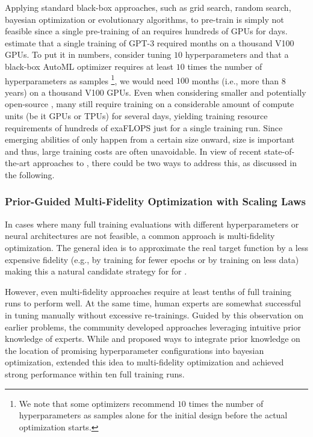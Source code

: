 Applying standard black-box \AutoML approaches, such as grid search, random search, bayesian optimization or evolutionary algorithms, to pre-train \LLMs is simply not feasible since a single pre-training of an \LLM requires hundreds of GPUs for days. \cite{brown-neurips20a} estimate that a single training of GPT-3 required months on a thousand V100 GPUs. To put it in numbers, consider tuning $10$ hyperparameters and that a black-box AutoML optimizer requires at least $10$ times the number of hyperparameters as samples \footnote{We note that some optimizers recommend $10$ times the number of hyperparameters as samples alone for the initial design before the actual optimization starts.}, we would need $100$ months (i.e., more than 8 years) on a thousand V100 GPUs. Even when considering smaller and potentially open-source \LLMs, many still require training on a considerable amount of compute units (be it GPUs or TPUs) for several days, yielding training resource requirements of hundreds of exaFLOPS \cite{geiping-icml23a} just for a single training run. Since emerging abilities of \LLMs only happen from a certain size onward, size is important and thus, large training costs are often unavoidable. In view of recent state-of-the-art approaches to \AutoML, there could be two ways to address this, as discussed in the following.

\subsubsection{Prior-Guided Multi-Fidelity Optimization with Scaling Laws}

In cases where many full training evaluations with different hyperparameters or neural architectures are not feasible, a common \AutoML approach is multi-fidelity optimization. The general idea is to approximate the real target function by a less expensive fidelity (e.g., by training for fewer epochs or by training on less data) making this a natural candidate strategy for \HPO for \LLMs.

However, even multi-fidelity approaches require at least tenths of full training runs to perform well. At the same time, human experts are somewhat successful in tuning \LLMs manually without excessive re-trainings. Guided by this observation on earlier \AutoML problems, the community developed approaches leveraging intuitive prior knowledge of experts. While \cite{souza-ecmlpkdd21a} and \cite{hvarfner-iclr22a} proposed ways to integrate prior knowledge on the location of promising hyperparameter configurations into bayesian optimization, \cite{mallik-neurips23a} extended this idea to multi-fidelity optimization and achieved strong performance within ten full training runs.

